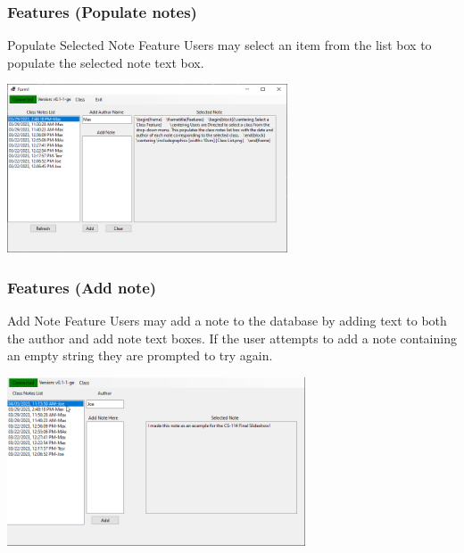 \documentclass[aspectratio=169]{beamer}
\begin{document}
\begin{frame}
    \frametitle{Features (Populate notes)}

    \begin{block}{\centering Populate Selected Note Feature}
        \centering Users may select an item from the list box to populate the selected note text box.
    \end{block}

    \centering \includegraphics[height=5cm]{Select Class Note.png}
    
\end{frame}

\begin{frame}
    \frametitle{Features (Add note)}

    \begin{block}{\centering Add Note Feature}
        \centering Users may add a note to the database by adding text to both the author and add note text boxes. If the user attempts to add a note containing an empty string they are prompted to try again.
    \end{block}

    \centering \includegraphics[height=5cm]{created.png}

\end{frame}
\end{document}

